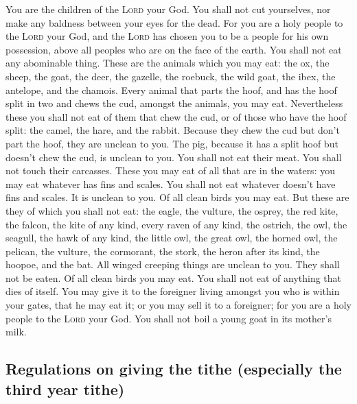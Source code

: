  You are the children of the \textsc{Lord} your God. You
shall not cut yourselves, nor make any baldness between your eyes for
the dead.  For you are a holy people to the \textsc{Lord}
your God, and the \textsc{Lord} has chosen you to be a people for his
own possession, above all peoples who are on the face of the earth.
 You shall not eat any abominable thing. 
These are the animals which you may eat: the ox, the sheep, the goat,
 the deer, the gazelle, the roebuck, the wild goat, the
ibex, the antelope, and the chamois.  Every animal that
parts the hoof, and has the hoof split in two and chews the cud, amongst
the animals, you may eat.  Nevertheless these you shall
not eat of them that chew the cud, or of those who have the hoof split:
the camel, the hare, and the rabbit. Because they chew the cud but don't
part the hoof, they are unclean to you.  The pig, because
it has a split hoof but doesn't chew the cud, is unclean to you. You
shall not eat their meat. You shall not touch their carcasses.
 These you may eat of all that are in the waters: you may
eat whatever has fins and scales.  You shall not eat
whatever doesn't have fins and scales. It is unclean to you.
 Of all clean birds you may eat.  But
these are they of which you shall not eat: the eagle, the vulture, the
osprey,  the red kite, the falcon, the kite of any kind,
 every raven of any kind,  the ostrich,
the owl, the seagull, the hawk of any kind,  the little
owl, the great owl, the horned owl,  the pelican, the
vulture, the cormorant,  the stork, the heron after its
kind, the hoopoe, and the bat.  All winged creeping
things are unclean to you. They shall not be eaten.  Of
all clean birds you may eat.  You shall not eat of
anything that dies of itself. You may give it to the foreigner living
amongst you who is within your gates, that he may eat it; or you may
sell it to a foreigner; for you are a holy people to the \textsc{Lord}
your God. You shall not boil a young goat in its mother's milk.

\hypertarget{regulations-on-giving-the-tithe-especially-the-third-year-tithe}{%
\subsection{Regulations on giving the tithe (especially the third year
tithe)}\label{regulations-on-giving-the-tithe-especially-the-third-year-tithe}}

